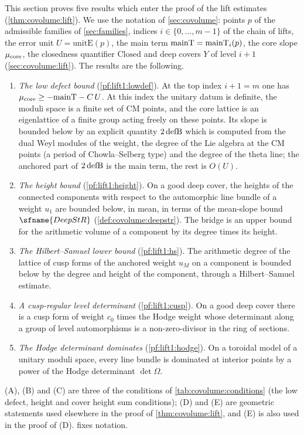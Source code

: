 This section proves five results which enter the proof of the lift estimates
(\cref{thm:covolume:lift}). We use the notation of \cref{sec:covolume}: points $p$ of the admissible
families of \cref{sec:families}, indices $i\in\{0,\dots,m-1\}$ of the chain of lifts, the error unit
$U=\mathrm{unitE}(p)$, the main term $\mathrm{mainT}=\mathrm{mainT}_i(p)$, the core slope $\mu_{\mathrm{core}}$,
the closedness quantifier $\mathrm{Closed}$ and deep covers $Y$ of level $i+1$
(\cref{sec:covolume:lift}). The results are the following.
\begin{enumerate}[label=(\Alph*)]
\item \emph{The low defect bound} (\cref{pf:lift1:lowdef}). At the top index $i+1=m$ one has
  $\mu_{\mathrm{core}}\ge-\mathrm{mainT}-C\,U$. At this index the unitary datum is definite, the moduli space is
  a finite set of CM points, and the core lattice is an eigenlattice of a finite group acting freely on
  these points. Its slope is bounded below by an explicit quantity $2\,\mathrm{defB}$ which is computed
  from the dual Weyl modules of the weight, the degree of the Lie algebra at the CM points (a period
  of Chowla--Selberg type) and the degree of the theta line; the anchored part of $2\,\mathrm{defB}$ is
  the main term, the rest is $O(U)$.
\item \emph{The height bound} (\cref{pf:lift1:height}). On a good deep cover, the heights of the
  connected components with respect to the automorphic line bundle of a weight $u_1$ are bounded below,
  in mean, in terms of the mean-slope bound $\sfname{DeepStR}$ (\cref{def:covolume:deepstr}). The bridge
  is an upper bound for the arithmetic volume of a component by its degree times its height.
\item \emph{The Hilbert--Samuel lower bound} (\cref{pf:lift1:hs}). The arithmetic degree of the
  lattice of cusp forms of the anchored weight $u_M$ on a component is bounded below by the degree and
  height of the component, through a Hilbert--Samuel estimate.
\item \emph{A cusp-regular level determinant} (\cref{pf:lift1:cusp}). On a good deep cover there is a
  cusp form of weight $c_0$ times the Hodge weight whose determinant along a group of level
  automorphisms is a non-zero-divisor in the ring of sections.
\item \emph{The Hodge determinant dominates} (\cref{pf:lift1:hodge}). On a toroidal model of a unitary
  moduli space, every line bundle is dominated at interior points by a power of the Hodge
  determinant $\det\Omega$.
\end{enumerate}
(A), (B) and (C) are three of the conditions of \cref{tab:covolume:conditions} (the low defect, height
and cover height sum conditions); (D) and (E) are geometric statements used elsewhere in the proof of
\cref{thm:covolume:lift}, and (E) is also used in the proof of (D).  fixes
notation.

